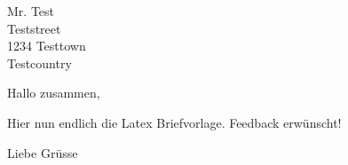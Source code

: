 \documentclass{scrartcl}
\author{Alexander Dietmüller}
\begin{document}
\begin{letter}{%
    Mr. Test\\
    Teststreet\\
    1234 Testtown\\
    Testcountry%
}

\opening{Hallo zusammen,}

Hier nun endlich die Latex Briefvorlage. Feedback erwünscht!

\closing{Liebe Grüsse}


\end{letter}
\end{document}
